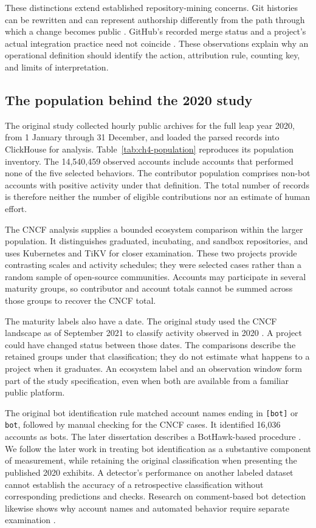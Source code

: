 These distinctions extend established repository-mining concerns. Git histories can be rewritten and can represent authorship differently from the path through which a change becomes public \citep{bird2009}. GitHub's recorded merge status and a project's actual integration practice need not coincide \citep{kalliamvakou2014}. These observations explain why an operational definition should identify the action, attribution rule, counting key, and limits of interpretation.

\subsection{The population behind the 2020 study}
The original study collected hourly public archives for the full leap year 2020, from 1 January through 31 December, and loaded the parsed records into ClickHouse for analysis. Table~\ref{tab:ch4-population} reproduces its population inventory. The 14,540,459 observed accounts include accounts that performed none of the five selected behaviors. The contributor population comprises non-bot accounts with positive activity under that definition. The total number of records is therefore neither the number of eligible contributions nor an estimate of human effort.



The CNCF analysis supplies a bounded ecosystem comparison within the larger population. It distinguishes graduated, incubating, and sandbox repositories, and uses Kubernetes and TiKV for closer examination. These two projects provide contrasting scales and activity schedules; they were selected cases rather than a random sample of open-source communities. Accounts may participate in several maturity groups, so contributor and account totals cannot be summed across those groups to recover the CNCF total.

The maturity labels also have a date. The original study used the CNCF landscape as of September 2021 to classify activity observed in 2020 \citep[Section VIII]{xia2022}. A project could have changed status between those dates. The comparisons describe the retained groups under that classification; they do not estimate what happens to a project when it graduates. An ecosystem label and an observation window form part of the study specification, even when both are available from a familiar public platform.

The original bot identification rule matched account names ending in \texttt{[bot]} or \texttt{bot}, followed by manual checking for the CNCF cases. It identified 16,036 accounts as bots. The later dissertation describes a BotHawk-based procedure \citep[Section 5.2.2]{xia2024thesis}. We follow the later work in treating bot identification as a substantive component of measurement, while retaining the original classification when presenting the published 2020 exhibits. A detector's performance on another labeled dataset cannot establish the accuracy of a retrospective classification without corresponding predictions and checks. Research on comment-based bot detection likewise shows why account names and automated behavior require separate examination \citep{golzadeh2021}.

